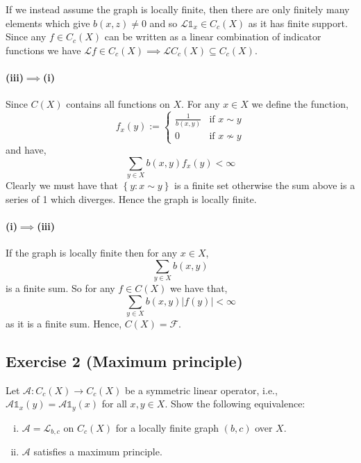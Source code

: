 If we instead assume the graph is locally finite, then there are only finitely many elements which give $b(x,z)\neq 0$ and so $\mathcal{L}\mathds{1}_{x}\in C_{c}(X)$ as it has finite support. Since any $f\in C_{c}(X)$ can be written as a linear combination of indicator functions we have $\mathcal{L}f\in C_{c}(X)\implies\mathcal{L}C_{c}(X)\subseteq C_{c}(X)$.

\paragraph{(iii)$\implies$(i)}
Since $C(X)$ contains all functions on $X$. For any $x\in X$ we define the function,
\begin{equation*}
	f_{x}(y) :=
	\begin{cases}
		\frac{1}{b(x,y)}& \text{if }x\sim y\\
		0& \text{if }x\not\sim y
	\end{cases}
\end{equation*}
and have,
\begin{equation*}
	\sum_{y\in X}b(x,y)f_{x}(y)<\infty
\end{equation*}
Clearly we must have that $\left\{y\colon x\sim y\right\}$ is a finite set otherwise the sum above is a series of 1 which diverges. Hence the graph is locally finite.

\paragraph{(i)$\implies$(iii)}
If the graph is locally finite then for any $x\in X$,
\begin{equation*}
	\sum_{y\in X}b(x,y)
\end{equation*}
is a finite sum. So for any $f\in C(X)$ we have that,
\begin{equation*}
	\sum_{y\in X}b(x,y)|f(y)|<\infty
\end{equation*}
as it is a finite sum. Hence, $C(X)=\mathcal{F}$.

\subsection{Exercise 2 (Maximum principle)}

Let $\mathcal{A}:C_{c}(X)\to C_{c}(X)$ be a symmetric linear operator, i.e., $\mathcal{A}\mathds{1}_{x}(y) = \mathcal{A}\mathds{1}_{y}(x)$ for all $x,y\in X$. Show the following equivalence:
\begin{enumerate}[(i)]
	\item
		$\mathcal{A}=\mathcal{L}_{b,c}$ on $C_{c}(X)$ for a locally finite graph $(b,c)$ over $X$.
	\item
		$\mathcal{A}$ satisfies a maximum principle.
\end{enumerate}


